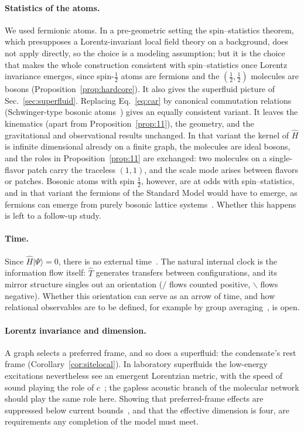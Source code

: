\documentclass[reprint,aps,prd,amsmath,amssymb,superscriptaddress,nofootinbib,floatfix]{revtex4-2}
\theoremstyle{plain}
\theoremstyle{definition}
\theoremstyle{remark}
\newcommand{\Lat}{\ensuremath{/}}                 %
\newcommand{\Rat}{\ensuremath{\backslash}}        %
\newcommand{\ket}[1]{\ensuremath{|#1\rangle}}
\newcommand{\Hc}{\hat{H}}
\newcommand{\Tc}{\hat{T}}
\begin{document}
\paragraph*{Statistics of the atoms.} We used fermionic atoms. In a pre-geometric setting the spin--statistics
theorem, which presupposes a Lorentz-invariant local field theory on a background, does not apply directly, so the
choice is a modeling assumption; but it is the choice that makes the whole construction consistent with
spin--statistics once Lorentz invariance emerges, since spin-$\tfrac12$ atoms are fermions and the $(\tfrac12,\tfrac12)$ molecules
are bosons (Proposition~\ref{prop:hardcore}). It also gives the superfluid picture of Sec.~\ref{sec:superfluid}. Replacing
Eq.~\eqref{eq:car} by canonical commutation relations (Schwinger-type bosonic atoms~\cite{Schwinger1952}) gives an equally
consistent variant. It leaves the kinematics (apart from Proposition~\ref{prop:11}), the geometry, and the gravitational
and observational results unchanged. In that
variant the kernel of $\Hc$ is infinite dimensional already on a finite graph, the molecules are ideal bosons,
and the roles in Proposition~\ref{prop:11} are exchanged: two molecules on a single-flavor patch carry the traceless
$(1,1)$, and the scale mode arises between flavors or patches. Bosonic atoms with spin $\tfrac12$, however, are at
odds with spin--statistics, and in that variant the fermions of the Standard Model would have to emerge, as fermions
can emerge from purely bosonic lattice systems~\cite{LevinWen2003}. Whether this happens is left to a follow-up
study.

\paragraph*{Time.} Since $\Hc\ket\Psi=0$, there is no external time~\cite{Isham1993,Kiefer2012}. The natural
internal clock is the information flow itself: $\Tc$ generates transfers between configurations, and its
mirror structure singles out an orientation ($\Lat$ flows counted positive, $\Rat$ flows negative). Whether
this orientation can serve as an arrow of time, and how relational observables are to be defined, for
example by group averaging~\cite{ALMMT1995}, is open.

\paragraph*{Lorentz invariance and dimension.} A graph selects a preferred frame, and so does a superfluid: the
condensate's rest frame (Corollary~\ref{cor:sitelocal}). In laboratory superfluids the low-energy excitations
nevertheless see an emergent Lorentzian metric, with the speed of sound playing the role of $c$~\cite{Barcelo2011,Volovik2009};
the gapless acoustic branch of the molecular network should play the same role here. Showing that preferred-frame effects are suppressed below current
bounds~\cite{Mattingly2005}, and that the effective dimension is four, are requirements any completion of
the model must meet.
\end{document}
